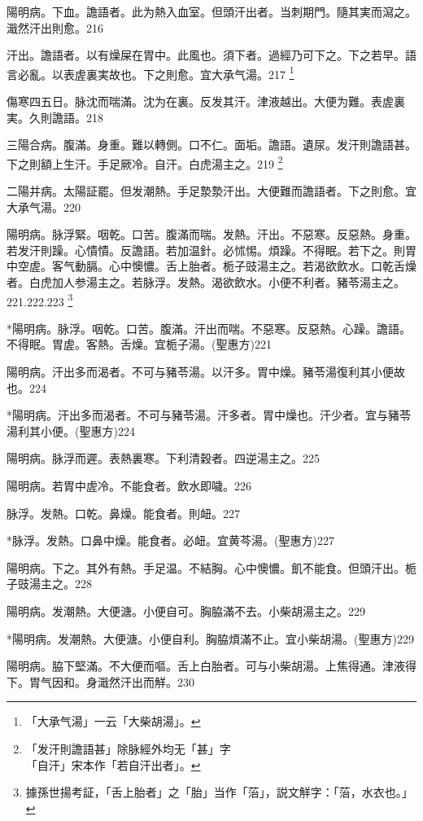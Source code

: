 \documentclass[12pt,twoside,UTF8,b5paper]{ctexbook}
\begin{document}
陽明病。下血。譫語者。此为熱入血室。但頭汗出者。当刺期門。隨其実而瀉之。濈然汗出則愈。216

汗出。譫語者。以有燥屎在胃中。此風也。{須下者。}過經乃可下之。下之若早。語言必亂。以表虗裏実故也。下之則愈。宜{大}承气湯。217
	\footnote{「大承气湯」一云「大柴胡湯」。}

傷寒四五日。脉沈而喘滿。沈为在裏。反发其汗。津液越出。大便为難。表虗裏実。久則譫語。218

三陽合病。腹滿。身重。難以轉側。口不仁。面垢。譫語。遺尿。发汗則譫語{甚}。下之則額上生汗。手足厥冷。自汗。白虎湯主之。219
	\footnote{「发汗則譫語甚」除脉經外均无「甚」字\\「自汗」宋本作「若自汗出者」。}

二陽并病。太陽証罷。但发潮熱。手足漐漐汗出。大便難而譫語者。下之則愈。宜{大}承气湯。220

陽明病。脉浮緊。咽乾。口苦。腹滿而喘。发熱。汗出。不惡寒。反惡熱。身重。若发汗則躁。心憒憒。反譫語。若加温針。必怵惕。煩躁。不得眠。若下之。則胃中空虗。客气動膈。心中懊憹。舌上胎者。栀子{豉}湯主之。若渴欲飲水。口乾舌燥者。白虎{加人参}湯主之。若脉浮。发熱。渴欲飲水。小便不利者。豬苓湯主之。221.222.223
	\footnote{據孫世揚考証，「舌上胎者」之「胎」当作「菭」，説文觧字：「菭，水衣也。」}

*陽明病。脉浮。咽乾。口苦。腹滿。汗出而喘。不惡寒。反惡熱。心躁。譫語。不得眠。胃虗。客熱。舌燥。宜栀子湯。(聖惠方)221

陽明病。汗出多而渴者。不可与豬苓湯。以汗多。胃中燥。豬苓湯復利其小便故也。224

*陽明病。汗出多而渴者。不可与豬苓湯。汗多者。胃中燥也。汗少者。宜与豬苓湯利其小便。(聖惠方)224

{陽明病。}脉浮而遲。表熱裏寒。下利清穀者。四逆湯主之。225

{陽明病。}若胃中虗冷。不能食者。飲水即噦。226

脉浮。发熱。口乾。鼻燥。能食者。則衄。227

*脉浮。发熱。口鼻中燥。能食者。必衄。宜黄芩湯。(聖惠方)227

陽明病。下之。其外有熱。手足温。不結胸。心中懊憹。飢不能食。但頭汗出。栀子{豉}湯主之。228

陽明病。发潮熱。大便溏。小便自可。胸脇滿不去。小柴胡湯主之。229

*陽明病。发潮熱。大便溏。小便自利。胸脇煩滿不止。宜小柴胡湯。(聖惠方)229

陽明病。脇下堅滿。不大便而嘔。舌上白胎者。可与小柴胡湯。上焦得通。津液得下。胃气因和。身濈然汗出而觧。230
\end{document}

